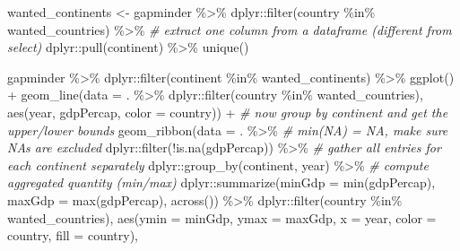 \documentclass[
  oneside]{book}
\newenvironment{Shaded}{\begin{snugshade}}{\end{snugshade}}
\newcommand{\AttributeTok}[1]{\textcolor[rgb]{0.77,0.63,0.00}{#1}}
\newcommand{\CommentTok}[1]{\textcolor[rgb]{0.56,0.35,0.01}{\textit{#1}}}
\newcommand{\FunctionTok}[1]{\textcolor[rgb]{0.00,0.00,0.00}{#1}}
\newcommand{\NormalTok}[1]{#1}
\newcommand{\OtherTok}[1]{\textcolor[rgb]{0.56,0.35,0.01}{#1}}
\newcommand{\SpecialCharTok}[1]{\textcolor[rgb]{0.00,0.00,0.00}{#1}}
\begin{document}
\begin{Shaded}
\begin{Highlighting}[]
\NormalTok{wanted\_continents }\OtherTok{\textless{}{-}}\NormalTok{ gapminder }\SpecialCharTok{\%\textgreater{}\%}
\NormalTok{  dplyr}\SpecialCharTok{::}\FunctionTok{filter}\NormalTok{(country }\SpecialCharTok{\%in\%}\NormalTok{ wanted\_countries) }\SpecialCharTok{\%\textgreater{}\%}
  \CommentTok{\# extract one column from a dataframe (different from select)}
\NormalTok{  dplyr}\SpecialCharTok{::}\FunctionTok{pull}\NormalTok{(continent) }\SpecialCharTok{\%\textgreater{}\%}
  \FunctionTok{unique}\NormalTok{()}

\NormalTok{gapminder }\SpecialCharTok{\%\textgreater{}\%}
\NormalTok{  dplyr}\SpecialCharTok{::}\FunctionTok{filter}\NormalTok{(continent }\SpecialCharTok{\%in\%}\NormalTok{ wanted\_continents) }\SpecialCharTok{\%\textgreater{}\%}
  \FunctionTok{ggplot}\NormalTok{() }\SpecialCharTok{+}
    \FunctionTok{geom\_line}\NormalTok{(}\AttributeTok{data =}\NormalTok{ . }\SpecialCharTok{\%\textgreater{}\%}
\NormalTok{      dplyr}\SpecialCharTok{::}\FunctionTok{filter}\NormalTok{(country }\SpecialCharTok{\%in\%}\NormalTok{ wanted\_countries),}
              \FunctionTok{aes}\NormalTok{(year, gdpPercap, }\AttributeTok{color =}\NormalTok{ country)) }\SpecialCharTok{+}
    \CommentTok{\# now group by continent and get the upper/lower bounds}
    \FunctionTok{geom\_ribbon}\NormalTok{(}\AttributeTok{data =}\NormalTok{ . }\SpecialCharTok{\%\textgreater{}\%}
      \CommentTok{\# min(NA) = NA, make sure NAs are excluded}
\NormalTok{      dplyr}\SpecialCharTok{::}\FunctionTok{filter}\NormalTok{(}\SpecialCharTok{!}\FunctionTok{is.na}\NormalTok{(gdpPercap)) }\SpecialCharTok{\%\textgreater{}\%}
      \CommentTok{\# gather all entries for each continent separately}
\NormalTok{      dplyr}\SpecialCharTok{::}\FunctionTok{group\_by}\NormalTok{(continent, year) }\SpecialCharTok{\%\textgreater{}\%}
      \CommentTok{\# compute aggregated quantity (min/max)}
\NormalTok{      dplyr}\SpecialCharTok{::}\FunctionTok{summarize}\NormalTok{(}\AttributeTok{minGdp =} \FunctionTok{min}\NormalTok{(gdpPercap),}
                       \AttributeTok{maxGdp =} \FunctionTok{max}\NormalTok{(gdpPercap), }\FunctionTok{across}\NormalTok{()) }\SpecialCharTok{\%\textgreater{}\%}
\NormalTok{      dplyr}\SpecialCharTok{::}\FunctionTok{filter}\NormalTok{(country }\SpecialCharTok{\%in\%}\NormalTok{ wanted\_countries),}
              \FunctionTok{aes}\NormalTok{(}\AttributeTok{ymin =}\NormalTok{ minGdp, }\AttributeTok{ymax =}\NormalTok{ maxGdp,}
                  \AttributeTok{x =}\NormalTok{ year, }\AttributeTok{color =}\NormalTok{ country, }\AttributeTok{fill =}\NormalTok{ country),}

\end{Highlighting}
\end{Shaded}
\end{document}
